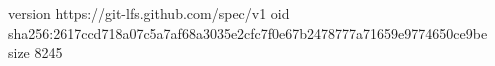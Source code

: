 version https://git-lfs.github.com/spec/v1
oid sha256:2617ccd718a07c5a7af68a3035e2cfc7f0e67b2478777a71659e9774650ce9be
size 8245

